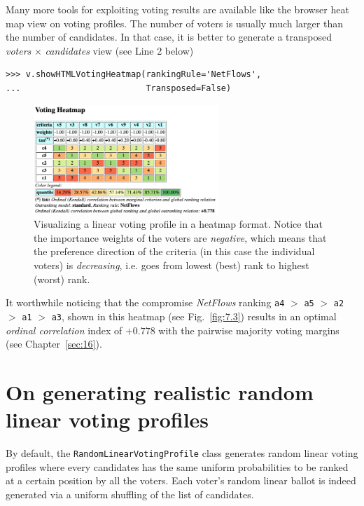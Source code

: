 Many more tools for exploiting voting results are available like the browser heat map view on voting profiles. The number of voters is usually much larger than the number of candidates. In that case, it is better to generate a transposed \emph{voters} $\times$ \emph{candidates} view (see Line 2 below) 
\begin{lstlisting}
>>> v.showHTMLVotingHeatmap(rankingRule='NetFlows',
...                         Transposed=False)
\end{lstlisting}
\begin{figure}[h]
\sidecaption[t]
\includegraphics[width=7cm]{Figures/7-3-votingHeatmap.png}
\caption{Visualizing a linear voting profile in a heatmap format. Notice that the importance weights of the voters are \emph{negative}, which means that the preference direction of the criteria (in this case the individual voters) is \emph{decreasing}, i.e. goes from lowest (best) rank to highest (worst) rank.
}
\label{fig:7.3}       %
\end{figure}

It worthwhile noticing that the compromise \emph{NetFlows} ranking \texttt{a4} $>$ \texttt{a5} $>$ \texttt{a2} $>$ \texttt{a1} $>$ \texttt{a3}, shown in this heatmap (see Fig.~\vref{fig:7.3}) results in an optimal \emph{ordinal correlation} index of $+0.778$ with the pairwise majority voting margins (see Chapter~\vref{sec:16}). 

\section{On generating realistic random linear voting profiles}
\label{sec:7.5}

By default, the \texttt{RandomLinearVotingProfile} class generates random linear voting profiles where every candidates has the same uniform probabilities to be ranked at a certain position by all the voters. Each voter's random linear ballot is indeed generated  via a uniform shuffling of the list of candidates.

